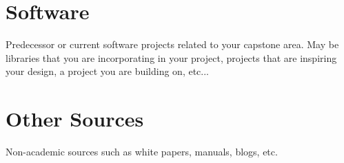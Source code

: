 


\section{Software}

Predecessor or current software projects related to your capstone area. May be libraries that you are incorporating in your project, projects that are inspiring your design, a project you are building on, etc...




\section{Other Sources}

Non-academic sources such as white papers, manuals, blogs, etc.


